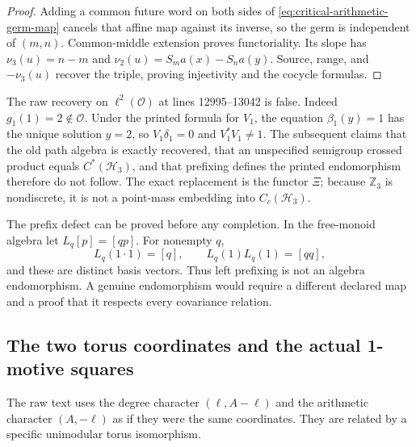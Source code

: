 \begin{proof}
Adding a common future word on both sides of
\eqref{eq:critical-arithmetic-germ-map} cancels that affine map against its
inverse, so the germ is independent of $(m,n)$.  Common-middle extension
proves functoriality.  Its slope has $\nu_3(u)=n-m$ and
$\nu_2(u)=S_ma(x)-S_na(y)$.  Source, range, and $-\nu_3(u)$ recover the
triple, proving injectivity and the cocycle formulas.
\end{proof}

The raw recovery on $\ell^2(\mathcal O)$ at lines 12995--13042 is false.
Indeed $g_1(1)=2\notin\mathcal O$.  Under the printed formula for $V_1$, the
equation $\beta_1(y)=1$ has the unique solution $y=2$, so
$V_1\delta_1=0$ and $V_1^*V_1\ne1$.  The subsequent claims that the old path
algebra is exactly recovered, that an unspecified semigroup crossed product
equals $C^*(\mathcal H_3)$, and that prefixing defines the printed
endomorphism therefore do not follow.  The exact replacement is the functor
$\Xi$; because $\mathbb Z_3$ is nondiscrete, it is not a point-mass embedding
into $C_c(\mathcal H_3)$.

The prefix defect can be proved before any completion.  In the free-monoid
algebra let $L_q[p]=[qp]$.  For nonempty $q$,
\[
 L_q(1\cdot1)=[q],\qquad L_q(1)L_q(1)=[qq],
\]
and these are distinct basis vectors.  Thus left prefixing is not an algebra
endomorphism.  A genuine endomorphism would require a different declared map
and a proof that it respects every covariance relation.

\subsection{The two torus coordinates and the actual 1-motive squares}

The raw text uses the degree character $(\ell,A-\ell)$ and the arithmetic
character $(A,-\ell)$ as if they were the same coordinates.  They are related
by a specific unimodular torus isomorphism.

